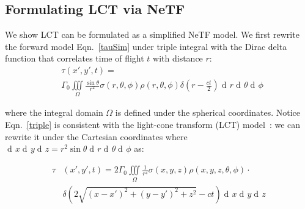 \documentclass[10pt,journal,compsoc]{IEEEtran}
\DeclareMathOperator{\di}{d\!}
\begin{document}


\fi

\begin{appendices}
\section{Formulating LCT via NeTF}
We show LCT can be formulated as a simplified NeTF model. We first rewrite the forward model Eqn.~\ref{tauSim} under triple integral with the Dirac delta function that correlates time of flight $t$ with distance $r$:
\begin{equation}
\begin{split}
    &\tau(x', y',t) = \\
    &\Gamma_{0} \underset{\Omega}{\iiint} \frac{\sin{\theta}}{r^{2}} \sigma(r, \theta,\phi) \rho(r, \theta,\phi) \delta(r - \frac{ct}{2}) \di{r}\di{\theta} \di{\phi}
\end{split}
\label{triple}
\end{equation}



\noindent where the integral domain $\Omega$ is defined under the spherical coordinates. Notice Eqn.~\ref{triple} is consistent with the light-cone transform (LCT) model~\cite{2018LCT}: we can rewrite it under the Cartesian coordinates where $\di{x}\di{y}\di{z} = {r^2 \sin{\theta}} {\di{r}\di{\theta} \di{\phi}}$ as:

\begin{equation}
\begin{split}
\tau&(x', y',t) = 2\Gamma_{0} \underset{\Omega}{\iiint} \frac{1}{r^4} \sigma(x,y,z) \rho(x,y,z,\theta,\phi) \cdot \\
& \delta(2\sqrt{(x - x')^2 + (y - y')^2 +z^2} - ct)\di{x}\di{y}\di{z}    
\end{split}
\label{after transform}
\end{equation}


\end{appendices}
\end{document}
